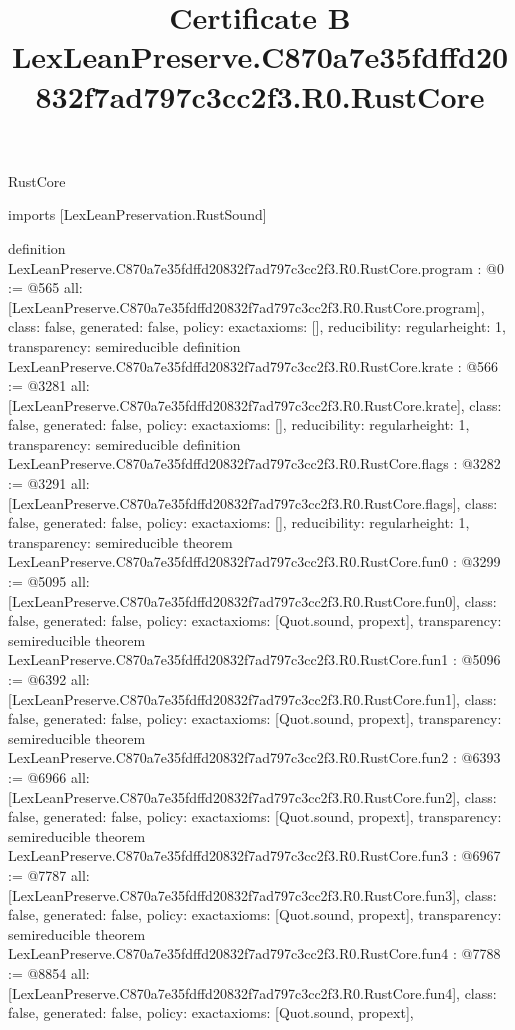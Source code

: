 \begin{lexlean}{RustCore}
\title{Certificate B LexLeanPreserve.C870a7e35fdffd20832f7ad797c3cc2f3.R0.RustCore}
\begin{coremodule}
imports [LexLeanPreservation.RustSound]

definition LexLeanPreserve.C870a7e35fdffd20832f7ad797c3cc2f3.R0.RustCore.program : @0 := @565 {
  all: [LexLeanPreserve.C870a7e35fdffd20832f7ad797c3cc2f3.R0.RustCore.program],
  class: false,
  generated: false,
  policy: exact{axioms: []},
  reducibility: regular{height: 1},
  transparency: semireducible
}
definition LexLeanPreserve.C870a7e35fdffd20832f7ad797c3cc2f3.R0.RustCore.krate : @566 := @3281 {
  all: [LexLeanPreserve.C870a7e35fdffd20832f7ad797c3cc2f3.R0.RustCore.krate],
  class: false,
  generated: false,
  policy: exact{axioms: []},
  reducibility: regular{height: 1},
  transparency: semireducible
}
definition LexLeanPreserve.C870a7e35fdffd20832f7ad797c3cc2f3.R0.RustCore.flags : @3282 := @3291 {
  all: [LexLeanPreserve.C870a7e35fdffd20832f7ad797c3cc2f3.R0.RustCore.flags],
  class: false,
  generated: false,
  policy: exact{axioms: []},
  reducibility: regular{height: 1},
  transparency: semireducible
}
theorem LexLeanPreserve.C870a7e35fdffd20832f7ad797c3cc2f3.R0.RustCore.fun0 : @3299 := @5095 {
  all: [LexLeanPreserve.C870a7e35fdffd20832f7ad797c3cc2f3.R0.RustCore.fun0],
  class: false,
  generated: false,
  policy: exact{axioms: [Quot.sound, propext]},
  transparency: semireducible
}
theorem LexLeanPreserve.C870a7e35fdffd20832f7ad797c3cc2f3.R0.RustCore.fun1 : @5096 := @6392 {
  all: [LexLeanPreserve.C870a7e35fdffd20832f7ad797c3cc2f3.R0.RustCore.fun1],
  class: false,
  generated: false,
  policy: exact{axioms: [Quot.sound, propext]},
  transparency: semireducible
}
theorem LexLeanPreserve.C870a7e35fdffd20832f7ad797c3cc2f3.R0.RustCore.fun2 : @6393 := @6966 {
  all: [LexLeanPreserve.C870a7e35fdffd20832f7ad797c3cc2f3.R0.RustCore.fun2],
  class: false,
  generated: false,
  policy: exact{axioms: [Quot.sound, propext]},
  transparency: semireducible
}
theorem LexLeanPreserve.C870a7e35fdffd20832f7ad797c3cc2f3.R0.RustCore.fun3 : @6967 := @7787 {
  all: [LexLeanPreserve.C870a7e35fdffd20832f7ad797c3cc2f3.R0.RustCore.fun3],
  class: false,
  generated: false,
  policy: exact{axioms: [Quot.sound, propext]},
  transparency: semireducible
}
theorem LexLeanPreserve.C870a7e35fdffd20832f7ad797c3cc2f3.R0.RustCore.fun4 : @7788 := @8854 {
  all: [LexLeanPreserve.C870a7e35fdffd20832f7ad797c3cc2f3.R0.RustCore.fun4],
  class: false,
  generated: false,
  policy: exact{axioms: [Quot.sound, propext]},
}
\end{coremodule}
\end{lexlean}
